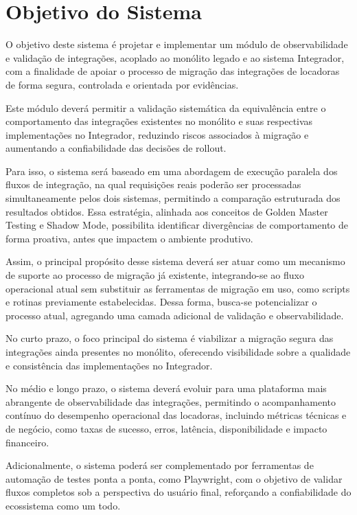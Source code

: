 \section{Objetivo do Sistema}

O objetivo deste sistema é projetar e implementar um módulo de observabilidade e validação de integrações, acoplado ao monólito legado e ao sistema Integrador, com a finalidade de apoiar o processo de migração das integrações de locadoras de forma segura, controlada e orientada por evidências.

Este módulo deverá permitir a validação sistemática da equivalência entre o comportamento das integrações existentes no monólito e suas respectivas implementações no Integrador, reduzindo riscos associados à migração e aumentando a confiabilidade das decisões de rollout.

Para isso, o sistema será baseado em uma abordagem de execução paralela dos fluxos de integração, na qual requisições reais poderão ser processadas simultaneamente pelos dois sistemas, permitindo a comparação estruturada dos resultados obtidos. Essa estratégia, alinhada aos conceitos de Golden Master Testing e Shadow Mode, possibilita identificar divergências de comportamento de forma proativa, antes que impactem o ambiente produtivo.

Assim, o principal propósito desse sistema deverá ser atuar como um mecanismo de suporte ao processo de migração já existente, integrando-se ao fluxo operacional atual sem substituir as ferramentas de migração em uso, como scripts e rotinas previamente estabelecidas. Dessa forma, busca-se potencializar o processo atual, agregando uma camada adicional de validação e observabilidade.

No curto prazo, o foco principal do sistema é viabilizar a migração segura das integrações ainda presentes no monólito, oferecendo visibilidade sobre a qualidade e consistência das implementações no Integrador.

No médio e longo prazo, o sistema deverá evoluir para uma plataforma mais abrangente de observabilidade das integrações, permitindo o acompanhamento contínuo do desempenho operacional das locadoras, incluindo métricas técnicas e de negócio, como taxas de sucesso, erros, latência, disponibilidade e impacto financeiro.

Adicionalmente, o sistema poderá ser complementado por ferramentas de automação de testes ponta a ponta, como Playwright, com o objetivo de validar fluxos completos sob a perspectiva do usuário final, reforçando a confiabilidade do ecossistema como um todo.